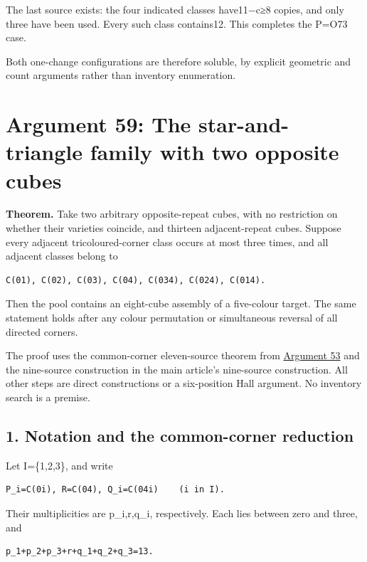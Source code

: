 \documentclass[
  10pt,
]{article}
\begin{document}
The last source exists: the four indicated classes have11−c≥8 copies,
and only three have been used. Every such class contains12. This
completes the P=O73 case.

Both one-change configurations are therefore soluble, by explicit
geometric and count arguments rather than inventory enumeration.

\hypertarget{arg-59}{%
\section{Argument 59: The star-and-triangle family with two opposite
cubes}\label{arg-59}}

\textbf{Theorem.} Take two arbitrary opposite-repeat cubes, with no
restriction on whether their varieties coincide, and thirteen
adjacent-repeat cubes. Suppose every adjacent tricoloured-corner class
occurs at most three times, and all adjacent classes belong to

\begin{verbatim}
C(01), C(02), C(03), C(04), C(034), C(024), C(014).
\end{verbatim}

Then the pool contains an eight-cube assembly of a five-colour target.
The same statement holds after any colour permutation or simultaneous
reversal of all directed corners.

The proof uses the common-corner eleven-source theorem from
\protect\hyperlink{arg-53}{Argument 53} and the nine-source construction
in the main article's nine-source construction. All other steps are
direct constructions or a six-position Hall argument. No inventory
search is a premise.

\hypertarget{notation-and-the-common-corner-reduction}{%
\subsection*{1. Notation and the common-corner
reduction}\label{notation-and-the-common-corner-reduction}}

Let I=\{1,2,3\}, and write

\begin{verbatim}
P_i=C(0i), R=C(04), Q_i=C(04i)    (i in I).
\end{verbatim}

Their multiplicities are p\_i,r,q\_i, respectively. Each lies between
zero and three, and

\begin{verbatim}
p_1+p_2+p_3+r+q_1+q_2+q_3=13.
\end{verbatim}
\end{document}
